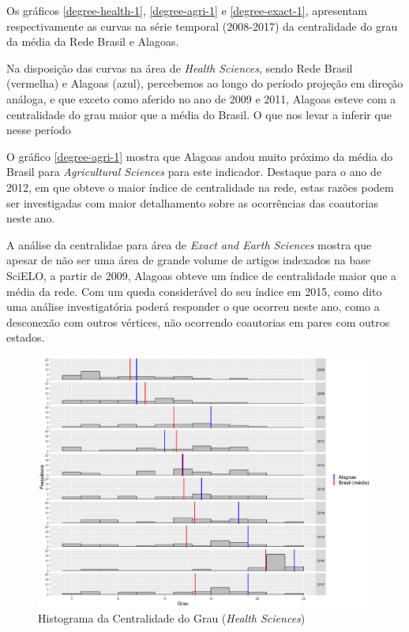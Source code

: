 Os gráficos \ref{degree-health-1}, \ref{degree-agri-1} e \ref{degree-exact-1}, apresentam respectivamente as curvas na série temporal (2008-2017) da centralidade do grau da média da Rede Brasil e Alagoas. 

Na disposição das curvas na área de \textit{Health Sciences}, sendo Rede Brasil (vermelha) e Alagoas (azul), percebemos ao longo do período projeção em direção análoga, e que exceto como aferido no ano de 2009 e 2011, Alagoas esteve com a centralidade do grau maior que a média do Brasil. O que nos levar a inferir que nesse período

O gráfico \ref{degree-agri-1} mostra que Alagoas andou muito próximo da média do Brasil para \textit{Agricultural Sciences} para este indicador. Destaque para o ano de 2012, em que obteve o maior índice de centralidade na rede, estas razões podem ser investigadas com maior detalhamento sobre as ocorrências das coautorias neste ano.

A análise da centralidae para área de \textit{Exact and Earth Sciences} mostra que apesar de não ser uma área de grande volume de artigos indexados na base SciELO, a partir de 2009, Alagoas obteve um índice de centralidade maior que a média da rede. Com um queda considerável do seu índice em 2015, como dito uma análise investigatória poderá responder o que ocorreu neste ano, como a desconexão com outros vértices, não ocorrendo coautorias em pares com outros estados.


\begin{figure}[H]
	\centering
	\includegraphics[scale=0.5]{Imagens/degree-hist.pdf}
	\caption{Histograma da Centralidade do Grau (\textit{Health Sciences})}
	\label{degree-health-hist-1}
\end{figure}

